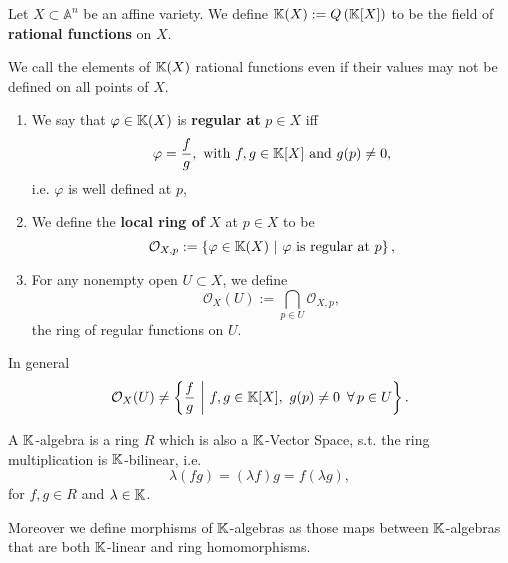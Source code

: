 \begin{defn}
	Let $X \subset \mathbb{A}^n$ be an affine variety.
	We define $\mathbb{K}(X) := Q \left( \mathbb{K}[X] \right)$ to be the field of \textbf{rational functions} on $X$.
\end{defn}

\begin{rem}
	We call the elements of  $\mathbb{K}(X)$ rational functions even if their values may not be defined on all points of $X$.
\end{rem}

\begin{defn}\leavevmode\vspace{-.2\baselineskip}
	\begin{enumerate}
		\item We say that $\varphi \in \mathbb{K}(X)$ is \textbf{regular at} $p \in X$ iff
			\begin{equation}
				\varphi = \frac{f}{g}, \text{ with }  f,g \in \mathbb{K}[X] \text{ and } g(p) \neq 0
			,\end{equation} 
			i.e. $\varphi$ is well defined at $p$,
		\item We define the \textbf{local ring of} $X$ at $p \in X$ to be
			\begin{equation}
				\mathcal{O}_{X,p} := \left\{ \varphi \in \mathbb{K}(X) \ \middle|\ \varphi \text{ is regular at } p \right\}
			,\end{equation} 
		\item For any nonempty open $U \subset X$, we define
			\begin{equation}
				\mathcal{O}_X (U) := \bigcap_{p \in U} \mathcal{O}_{X,p}
			,\end{equation} 
			the ring of regular functions on $U$.
	\end{enumerate}
\end{defn}

\begin{rem}
	In general
	\begin{equation}
		\mathcal{O}_X (U) \neq \left\{ \frac{f}{g} \ \middle|\ f,g \in \mathbb{K}[X],\ g(p) \neq 0\ \,\forall\, p \in U  \right\}
	.\end{equation} 
\end{rem}

\begin{defn}[$\K$-algebra]
	A $\K$-algebra is a ring $R$ which is also a $\K$-Vector Space, s.t. the ring multiplication is $\K$-bilinear, i.e.
	\begin{equation}
		\lambda(fg) = (\lambda f)g = f(\lambda g)
	,\end{equation} 
	for $f,g \in R$ and $\lambda \in \mathbb{K}$.

	Moreover we define morphisms of $\K$-algebras as those maps between $\K$-algebras that are both $\K$-linear and ring homomorphisms.
\end{defn}

